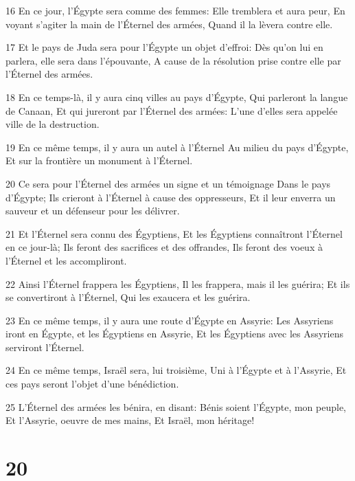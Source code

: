 \par 16 En ce jour, l'Égypte sera comme des femmes: Elle tremblera et aura peur, En voyant s'agiter la main de l'Éternel des armées, Quand il la lèvera contre elle.
\par 17 Et le pays de Juda sera pour l'Égypte un objet d'effroi: Dès qu'on lui en parlera, elle sera dans l'épouvante, A cause de la résolution prise contre elle par l'Éternel des armées.
\par 18 En ce temps-là, il y aura cinq villes au pays d'Égypte, Qui parleront la langue de Canaan, Et qui jureront par l'Éternel des armées: L'une d'elles sera appelée ville de la destruction.
\par 19 En ce même temps, il y aura un autel à l'Éternel Au milieu du pays d'Égypte, Et sur la frontière un monument à l'Éternel.
\par 20 Ce sera pour l'Éternel des armées un signe et un témoignage Dans le pays d'Égypte; Ils crieront à l'Éternel à cause des oppresseurs, Et il leur enverra un sauveur et un défenseur pour les délivrer.
\par 21 Et l'Éternel sera connu des Égyptiens, Et les Égyptiens connaîtront l'Éternel en ce jour-là; Ils feront des sacrifices et des offrandes, Ils feront des voeux à l'Éternel et les accompliront.
\par 22 Ainsi l'Éternel frappera les Égyptiens, Il les frappera, mais il les guérira; Et ils se convertiront à l'Éternel, Qui les exaucera et les guérira.
\par 23 En ce même temps, il y aura une route d'Égypte en Assyrie: Les Assyriens iront en Égypte, et les Égyptiens en Assyrie, Et les Égyptiens avec les Assyriens serviront l'Éternel.
\par 24 En ce même temps, Israël sera, lui troisième, Uni à l'Égypte et à l'Assyrie, Et ces pays seront l'objet d'une bénédiction.
\par 25 L'Éternel des armées les bénira, en disant: Bénis soient l'Égypte, mon peuple, Et l'Assyrie, oeuvre de mes mains, Et Israël, mon héritage!

\chapter{20}

